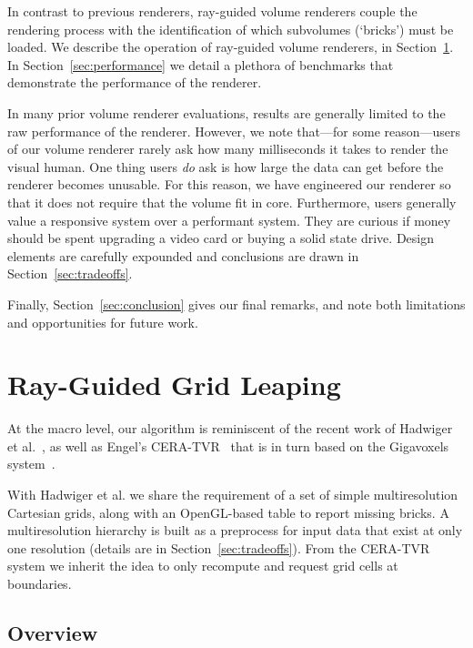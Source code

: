 In contrast to previous renderers, ray-guided volume renderers couple
the rendering process with the identification of which subvolumes
(`bricks') must be loaded.  We describe the operation of ray-guided
volume renderers, in Section~\ref{sec:algorithm}.
In Section~\ref{sec:performance} we detail a plethora of benchmarks
that demonstrate the performance of the renderer.

In many prior volume renderer evaluations, results are generally
limited to the raw performance of the renderer.  However, we note
that---for some reason---users of our volume renderer rarely ask how
many milliseconds it takes
to render the visual human.  One thing users \emph{do} ask is how large
the data can get before the renderer becomes unusable. For this reason,
we have engineered our renderer so that it does not require that the
volume fit in core.  Furthermore, users generally value a responsive
system over a performant system.  They are curious if money should be
spent upgrading a video card or buying a solid state drive.  Design
elements are carefully expounded and conclusions are drawn in
Section~\ref{sec:tradeoffs}.

Finally, Section~\ref{sec:conclusion} gives our final remarks, and note
both limitations and opportunities for future work.

\section{Ray-Guided Grid Leaping}
\label{sec:algorithm}

At the macro level, our algorithm is reminiscent of the recent work of
Hadwiger et
al.~\cite{Hadwiger:2012:Guided}, as well as Engel's
CERA-TVR~\cite{Engel:2012:CERA} that is in turn based on the Gigavoxels
system~\cite{Crassin:2009:Gigavoxels}.

With Hadwiger et al. we share the requirement of a set of simple
multiresolution Cartesian grids, along with an OpenGL-based table
to report missing bricks.  A multiresolution hierarchy is built as a
preprocess for input data that exist at only one resolution (details
are in Section~\ref{sec:tradeoffs}).  From the CERA-TVR system
we inherit the idea to only recompute and request grid cells at
boundaries.

\subsection{Overview}

